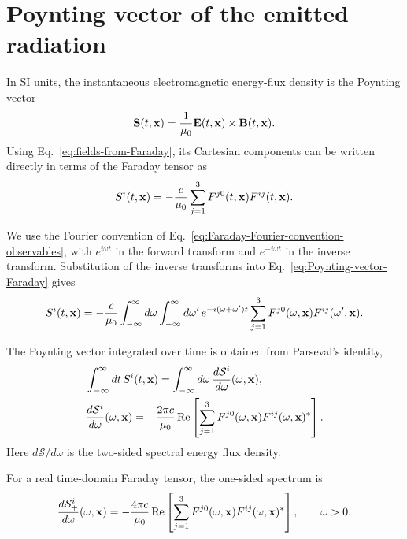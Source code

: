 \section{Poynting vector of the emitted radiation}

In SI units, the instantaneous electromagnetic energy-flux density is the
Poynting vector
\begin{align}
  {\bf S}(t,{\bf x})
  =\frac1{\mu_0}{\bf E}(t,{\bf x})\times{\bf B}(t,{\bf x}).
  \label{eq:standard-Poynting-vector}
\end{align}
Using Eq.~\eqref{eq:fields-from-Faraday}, its Cartesian components can be
written directly in terms of the Faraday tensor as
\begin{align}
  S^i(t,{\bf x})
  =-\frac{c}{\mu_0}\sum_{j=1}^{3}
  F^{j0}(t,{\bf x})F^{ij}(t,{\bf x}).
  \label{eq:Poynting-vector-Faraday}
\end{align}

We use the Fourier convention of
Eq.~\eqref{eq:Faraday-Fourier-convention-observables}, with $e^{i\omega t}$
in the forward transform and $e^{-i\omega t}$ in the inverse transform.
Substitution of the inverse transforms into
Eq.~\eqref{eq:Poynting-vector-Faraday} gives
\begin{align}
  S^i(t,{\bf x})
  =-\frac{c}{\mu_0}
  \int_{-\infty}^{\infty}d\omega
  \int_{-\infty}^{\infty}d\omega'\,
  e^{-i(\omega+\omega')t}
  \sum_{j=1}^{3}
  F^{j0}(\omega,{\bf x})F^{ij}(\omega',{\bf x}).
  \label{eq:instantaneous-Poynting-vector-Fourier-F}
\end{align}

The Poynting vector integrated over time is obtained from Parseval's identity,
\begin{align}
  &\int_{-\infty}^{\infty}dt\,S^i(t,{\bf x})
  =\int_{-\infty}^{\infty}d\omega\,
  \frac{d\mathcal S^i}{d\omega}(\omega,{\bf x}),\\
  &\frac{d\mathcal S^i}{d\omega}(\omega,{\bf x})
  =-\frac{2\pi c}{\mu_0}\operatorname{Re}
  \left[
    \sum_{j=1}^{3}F^{j0}(\omega,{\bf x})
    F^{ij}(\omega,{\bf x})^*
  \right].
  \label{eq:two-sided-spectral-Poynting-vector-F}
\end{align}
Here $d{\boldsymbol{\mathcal S}}/d\omega$ is the two-sided spectral energy
flux density.
\begin{highlightbox}[title={One-sided spectral Poynting vector}]
  For a real time-domain Faraday tensor, the one-sided spectrum
  is
  \begin{align}
    \frac{d\mathcal S^i_+}{d\omega}(\omega,{\bf x})
    =-\frac{4\pi c}{\mu_0}\operatorname{Re}
    \left[
      \sum_{j=1}^{3}F^{j0}(\omega,{\bf x})
      F^{ij}(\omega,{\bf x})^*
    \right],\qquad \omega>0.
    \label{eq:one-sided-spectral-Poynting-vector-F}
  \end{align}
\end{highlightbox}
